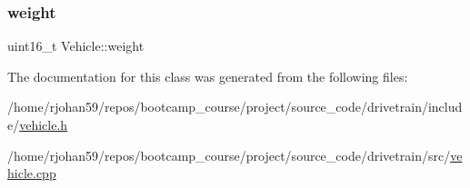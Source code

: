 \mbox{\label{classVehicle_aa7261c96ee3a5a4c039bf33432178fd9}} 
\subsubsection{\texorpdfstring{weight}{weight}}
{\footnotesize\ttfamily uint16\+\_\+t Vehicle\+::weight\hspace{0.3cm}{\ttfamily [private]}}



The documentation for this class was generated from the following files\+:\begin{DoxyCompactItemize}
\item 
/home/rjohan59/repos/bootcamp\+\_\+course/project/source\+\_\+code/drivetrain/include/\hyperlink{vehicle_8h}{vehicle.\+h}\item 
/home/rjohan59/repos/bootcamp\+\_\+course/project/source\+\_\+code/drivetrain/src/\hyperlink{vehicle_8cpp}{vehicle.\+cpp}\end{DoxyCompactItemize}
